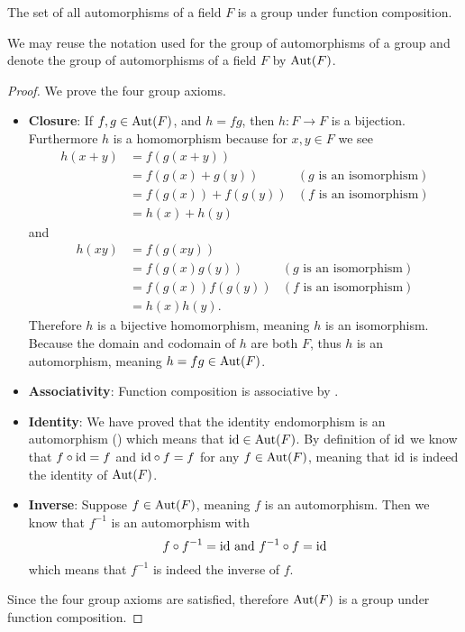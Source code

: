 \begin{proposition}
    The set of all automorphisms of a field $F$ is a group under function composition.
\end{proposition}
\begin{remark}
    We may reuse the notation used for the group of automorphisms of a group and denote the group of automorphisms of a field $F$ by $\mathrm{Aut}(F)$.
\end{remark}
\begin{proof}
    We prove the four group axioms.
    \begin{itemize}
        \item \textbf{Closure}: If $f, g \in \mathrm{Aut}(F)$, and $h = fg$, then $h: F \to F$ is a bijection. Furthermore $h$ is a homomorphism because for $x, y \in F$ we see
        \begin{align*}
            h(x+y) &= f(g(x + y))\\
            &= f(g(x) + g(y)) & (g \text{ is an isomorphism})\\
            &= f(g(x)) + f(g(y)) & (f \text{ is an isomorphism})\\
            &= h(x) + h(y)
        \end{align*}
        and
        \begin{align*}
            h(xy) &= f(g(xy))\\
            &= f(g(x)g(y)) & (g \text{ is an isomorphism})\\
            &= f(g(x))f(g(y)) & (f \text{ is an isomorphism})\\
            &= h(x)h(y).
        \end{align*}
        Therefore $h$ is a bijective homomorphism, meaning $h$ is an isomorphism. Because the domain and codomain of $h$ are both $F$, thus $h$ is an automorphism, meaning $h = fg \in \mathrm{Aut}(F)$.

        \item \textbf{Associativity}: Function composition is associative by .
        
        \item \textbf{Identity}: We have proved that the identity endomorphism is an automorphism () which means that $\mathrm{id} \in \mathrm{Aut}(F)$. By definition of $\mathrm{id}$ we know that $f\circ\mathrm{id} = f$ and $\mathrm{id}\circ f = f$ for any $f \in \mathrm{Aut}(F)$, meaning that $\mathrm{id}$ is indeed the identity of $\mathrm{Aut}(F)$.
        
        \item \textbf{Inverse}: Suppose $f \in \mathrm{Aut}(F)$, meaning $f$ is an automorphism. Then we know that $f^{-1}$ is an automorphism with
        \[
            f\circ f^{-1} = \mathrm{id} \text{ and } f^{-1} \circ f = \mathrm{id}
        \]
        which means that $f^{-1}$ is indeed the inverse of $f$.
    \end{itemize}
    Since the four group axioms are satisfied, therefore $\mathrm{Aut}(F)$ is a group under function composition.
\end{proof}

